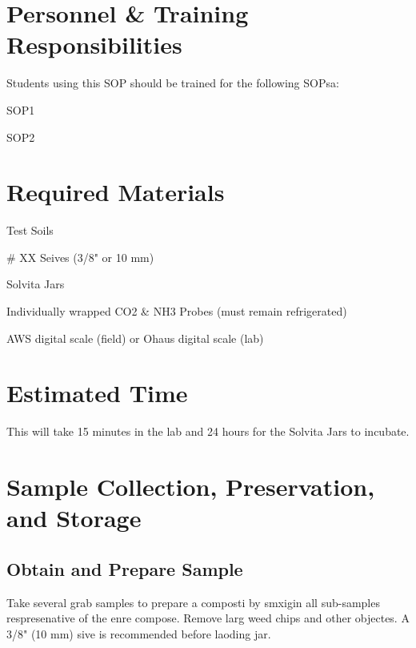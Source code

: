 \documentclass[12pt]{../SOP4_alpha}\usepackage[]{graphicx}\usepackage[]{xcolor}
\begin{document}


\section{Personnel \& Training Responsibilities}


Students using this SOP should be trained for the following SOPsa:

\begin{itemize*}
  \item SOP1
  \item SOP2
\end{itemize*}

\section{Required Materials}

\begin{itemize*}
  \item Test Soils
  \item \# XX Seives (3/8" or 10 mm)
  \item Solvita Jars
  \item Individually wrapped CO2 \& NH3 Probes (must remain refrigerated) 
  \item AWS digital scale (field) or Ohaus digital scale (lab)
\end{itemize*}

\section{Estimated Time}

\NP This will take 15 minutes in the lab and 24 hours for the Solvita Jars to incubate.

\section{Sample Collection, Preservation, and Storage}

\subsection{Obtain and Prepare Sample}

\NP Take several grab samples to prepare a composti by smxigin all sub-samples respresenative of the enre compose. Remove larg weed chips and other objectes. A 3/8" (10 mm) sive is recommended before laoding jar.
\end{document}
